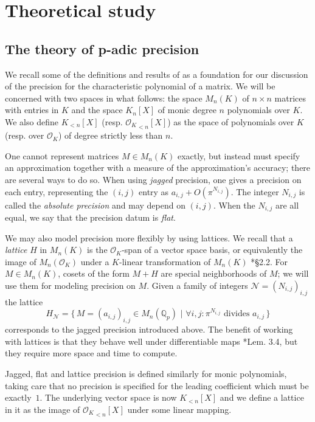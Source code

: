 \documentclass[sigconf]{acmart}
\newcommand{\Q}{\mathbb Q}
\newcommand{\Qp}{\Q_p}
\newcommand{\OK}{\mathcal{O}_K}
\newcommand{\famN}{\mathcal{N}}
\theoremstyle{definition}
\begin{document}
\section{Theoretical study}
\label{sec:theo_study}

\subsection{The theory of p-adic precision} \label{sec:padicprec}

We recall some of the definitions and results of \cite{caruso-roe-vaccon:14a}
as a foundation for our discussion of the precision for the characteristic polynomial
of a matrix.  We will be concerned with two spaces in what follows:
the space $M_n(K)$ of $n \times n$ matrices with entries in $K$ and the space
$K_n[X]$ of monic degree $n$ polynomials over $K$.  We also define $K_{<n}[X]$ (resp. 
${\OK}_{<n}[X]$) as the space of polynomials over $K$ (resp. over $\OK$) 
of degree strictly less than $n$.

One cannot represent
matrices $M \in M_n(K)$ exactly, but instead must specify an approximation
together with a measure of the approximation's accuracy; there are several ways to do so.
When using \emph{jagged} precision, one gives a precision on each entry,
representing the $(i,j)$ entry as $a_{i,j} + O(\pi^{N_{i,j}})$. The integer $N_{i,j}$ 
is called the \emph{absolute precision} and may depend on $(i,j)$.
When the $N_{i,j}$ are all equal, we say that the precision datum is 
\emph{flat}.

We may also model precision more flexibly by using lattices.  We 
recall that a \emph{lattice} $H$ in $M_n(K)$ is the $\OK$-span of a vector
space basis, or equivalently the image of $M_n(\OK)$ under a 
$K$-linear transformation of $M_n(K)$ \cite{caruso-roe-vaccon:14a}*{\S 2.2}.
For $M \in M_n(K)$, cosets of the form $M + H$ are special
neighborhoods of $M$; we will use them for modeling precision on $M$. 
Given a family of integers $\famN = (N_{i,j})_{i,j}$ the lattice
\[
H_{\famN} = \big\{ \, M = (a_{i,j})_{i,j} \in M_n(\Qp) \,\, | \,\, \forall i,\!j\!:
\pi^{N_{i,j}} \text{ divides } a_{i,j} \, \big\}
\]
corresponds to the jagged precision introduced above.
The benefit of working with lattices is that they behave well under 
differentiable maps \cite{caruso-roe-vaccon:14a}*{Lem. 3.4}, but they
require more space and time to compute. 

Jagged, flat and lattice precision is defined similarly for monic polynomials, 
taking care that no precision is specified for the leading 
coefficient which must be exactly~$1$. The underlying 
vector space is now $K_{<n}[X]$ and we define a lattice in it as the
image of ${\OK}_{<n}[X]$ under some linear mapping.
\end{document}
